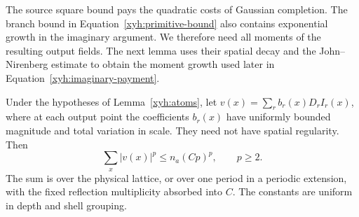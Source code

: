 The source square bound pays the quadratic costs of Gaussian
completion.  The branch bound in Equation~\eqref{xyh:primitive-bound}
also contains exponential growth in the imaginary argument.
We therefore need all moments of the resulting output fields.
The next lemma uses their spatial decay and the John--Nirenberg
estimate to obtain the moment growth used later in
Equation~\eqref{xyh:imaginary-payment}.

\begin{lemma}\label{xyh:moment-bound}
Under the hypotheses of Lemma~\ref{xyh:atoms}, let
$v(x)=\sum_r b_r(x)D_rI_r(x)$, where at each output point the
coefficients $b_r(x)$ have uniformly bounded magnitude and total
variation in scale. They need not have spatial regularity. Then
\begin{equation}\label{xyh:atom-moments}
 \sum_x|v(x)|^p\le n_a(Cp)^p,\qquad p\ge2.
\end{equation}
The sum is over the physical lattice, or over one period in a
periodic extension, with the fixed reflection multiplicity
absorbed into $C$. The constants are uniform in depth and shell
grouping.
\end{lemma}
